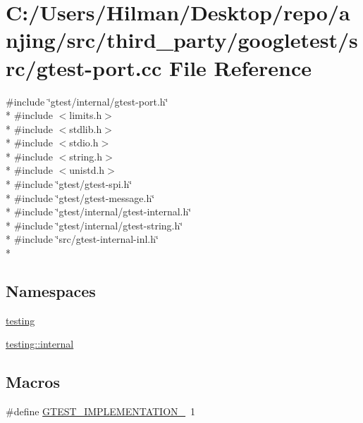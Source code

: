 \hypertarget{gtest-port_8cc}{}\section{C\+:/\+Users/\+Hilman/\+Desktop/repo/anjing/src/third\+\_\+party/googletest/src/gtest-\/port.cc File Reference}
\label{gtest-port_8cc}
{\ttfamily \#include \char`\"{}gtest/internal/gtest-\/port.\+h\char`\"{}}\\*
{\ttfamily \#include $<$limits.\+h$>$}\\*
{\ttfamily \#include $<$stdlib.\+h$>$}\\*
{\ttfamily \#include $<$stdio.\+h$>$}\\*
{\ttfamily \#include $<$string.\+h$>$}\\*
{\ttfamily \#include $<$unistd.\+h$>$}\\*
{\ttfamily \#include \char`\"{}gtest/gtest-\/spi.\+h\char`\"{}}\\*
{\ttfamily \#include \char`\"{}gtest/gtest-\/message.\+h\char`\"{}}\\*
{\ttfamily \#include \char`\"{}gtest/internal/gtest-\/internal.\+h\char`\"{}}\\*
{\ttfamily \#include \char`\"{}gtest/internal/gtest-\/string.\+h\char`\"{}}\\*
{\ttfamily \#include \char`\"{}src/gtest-\/internal-\/inl.\+h\char`\"{}}\\*
\subsection*{Namespaces}
\begin{DoxyCompactItemize}
\item 
 \hyperlink{namespacetesting}{testing}
\item 
 \hyperlink{namespacetesting_1_1internal}{testing\+::internal}
\end{DoxyCompactItemize}
\subsection*{Macros}
\begin{DoxyCompactItemize}
\item 
\#define \hyperlink{gtest-port_8cc_a83bd232fd1077579fada92c31bb7469f}{G\+T\+E\+S\+T\+\_\+\+I\+M\+P\+L\+E\+M\+E\+N\+T\+A\+T\+I\+O\+N\+\_\+}~1
\end{DoxyCompactItemize}
